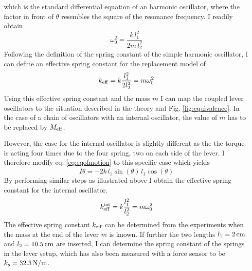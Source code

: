 \documentclass[12pt]{article}
\begin{document}
which is the standard differential equation of an harmonic oscillator, where the factor in front of $\theta$ resembles the square of the resonance frequency. 
I readily obtain
\begin{equation}
    \omega_{0}^{2}=\frac{k\, l_{1}^2}{2m\,l_{2}^2}
\end{equation}
Following the definition of the spring constant of the simple harmonic oscillator, I can define an effective spring constant for the replacement model of
\begin{equation}
    k_{\rm eff}=k\frac{l_{1}^2}{2l_{2}^2}=m\omega_{0}^2
\end{equation}
Using this effective spring constant and the mass $m$ I can map the coupled lever oscillators to the situation described in the theory and Fig. \ref{fig:equivalence}. In the case of a chain of oscillators with an internal oscillator, the value of $m$ has to be replaced by $M_{\rm eff}$.

However, the case for the internal oscillator is slightly different as the the torque is acting four times due to the four spring, two on each side of the lever. I therefore modify eq. \ref{eq:eqofmotion} to this specific case which yields
\begin{equation}
    I\ddot{\theta}=-2k\, l_{1}\sin(\theta)\, l_{1}\cos(\theta)
\end{equation}
By performing similar steps as illustrated above I obtain the effective spring constant for the internal oscillator.
\begin{equation}
    k^{\rm int}_{\rm eff}=k\frac{l_{1}^2}{l_{2}^2}=m\omega_{0}^2
\end{equation}
The effective spring constant $k_{\rm eff}$ can be determined from the experiments when the mass at the end of the lever $m$ is known. If further the two lengths $l_{1}=2\, {\rm cm}$ and $l_{2}=10.5\, {\rm cm}$ are inserted, I can determine the spring constant of the springs in the lever setup, which has also been measured with a force sensor to be $k_{s}=32.3\, {\rm N/m}$.
\end{document}
